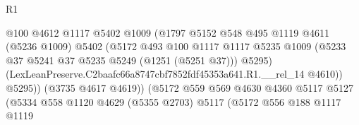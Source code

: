 \begin{lexlean}{R1}
\begin{coremodule}
                                            @100
                                            @4612
                                            @1117
                                            @5402
                                            @1009
                                            (@1797
                                              @5152
                                              @548
                                              @495
                                              @1119
                                              @4611
                                              (@5236 @1009)
                                              @5402
                                              (@5172
                                                @493
                                                @100
                                                @1117
                                                @1117
                                                @5235
                                                @1009
                                                (@5233
                                                  @37
                                                  @5241
                                                  @37
                                                  @5235
                                                  @5249
                                                  (@1251 (@5251 @37)))
                                                @5295)
                                              (LexLeanPreserve.C2baafc66a8747cbf7852fdf45353a641.R1.__rel_14
                                                @4610))
                                            @5295))
                                        (@3735 @4617 @4619))
                                      (@5172
                                        @559
                                        @569
                                        @4630
                                        @4360
                                        @5117
                                        @5127
                                        (@5334
                                          @558
                                          @1120
                                          @4629
                                          (@5355 @2703)
                                          @5117
                                          (@5172
                                            @556
                                            @188
                                            @1117
                                            @1119

\end{coremodule}
\end{lexlean}
